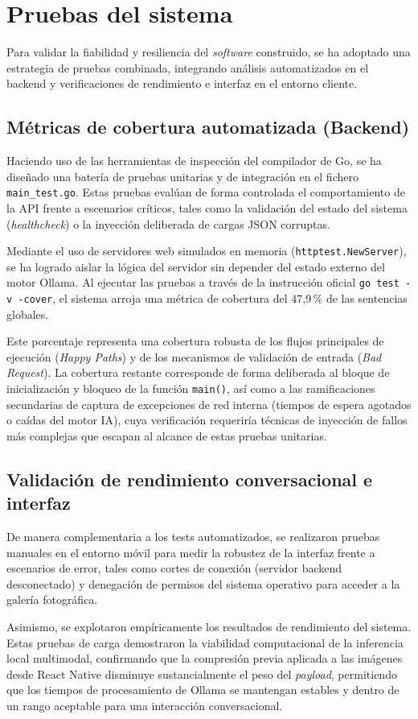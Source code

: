 \section{Pruebas del sistema}
Para validar la fiabilidad y resiliencia del \textit{software} construido, se ha adoptado una estrategia de pruebas combinada, integrando análisis automatizados en el backend y verificaciones de rendimiento e interfaz en el entorno cliente.

\subsection*{Métricas de cobertura automatizada (Backend)}
Haciendo uso de las herramientas de inspección del compilador de Go, se ha diseñado una batería de pruebas unitarias y de integración en el fichero \texttt{main\_test.go}. Estas pruebas evalúan de forma controlada el comportamiento de la API frente a escenarios críticos, tales como la validación del estado del sistema (\textit{healthcheck}) o la inyección deliberada de cargas JSON corruptas.

Mediante el uso de servidores web simulados en memoria (\texttt{httptest.NewServer}), se ha logrado aislar la lógica del servidor sin depender del estado externo del motor Ollama. Al ejecutar las pruebas a través de la instrucción oficial \texttt{go test -v -cover}, el sistema arroja una métrica de cobertura del 47,9\,\% de las sentencias globales. 

Este porcentaje representa una cobertura robusta de los flujos principales de ejecución (\textit{Happy Paths}) y de los mecanismos de validación de entrada (\textit{Bad Request}). La cobertura restante corresponde de forma deliberada al bloque de inicialización y bloqueo de la función \texttt{main()}, así como a las ramificaciones secundarias de captura de excepciones de red interna (tiempos de espera agotados o caídas del motor IA), cuya verificación requeriría técnicas de inyección de fallos más complejas que escapan al alcance de estas pruebas unitarias.

\subsection*{Validación de rendimiento conversacional e interfaz}
De manera complementaria a los tests automatizados, se realizaron pruebas manuales en el entorno móvil para medir la robustez de la interfaz frente a escenarios de error, tales como cortes de conexión (servidor backend desconectado) y denegación de permisos del sistema operativo para acceder a la galería fotográfica. 

Asimismo, se explotaron empíricamente los resultados de rendimiento del sistema. Estas pruebas de carga demostraron la viabilidad computacional de la inferencia local multimodal, confirmando que la compresión previa aplicada a las imágenes desde React Native disminuye sustancialmente el peso del \textit{payload}, permitiendo que los tiempos de procesamiento de Ollama se mantengan estables y dentro de un rango aceptable para una interacción conversacional.